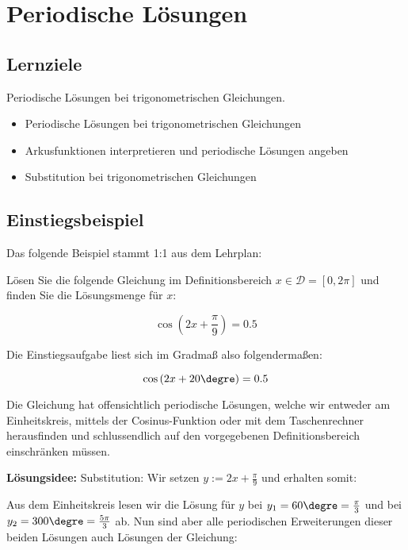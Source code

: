 
\section{Periodische Lösungen}

\subsection*{Lernziele}

Periodische Lösungen bei trigonometrischen Gleichungen.

\begin{itemize}
\item Periodische Lösungen bei trigonometrischen Gleichungen
\item Arkusfunktionen interpretieren und periodische Lösungen angeben
\item Substitution bei trigonometrischen Gleichungen
\end{itemize}



\subsection{Einstiegsbeispiel}
Das folgende Beispiel stammt 1:1 aus dem Lehrplan:

Lösen Sie die folgende Gleichung im Definitionsbereich $x \in \mathcal{D} = [ 0, 2\pi]$ und finden Sie die Lösungsmenge für $x$:

$$\cos\left(2x+\frac{\pi}{9}\right) = 0.5$$

Die Einstiegsaufgabe liest sich im Gradmaß also folgendermaßen:

$$\cos\left(2x+20\degre\right) = 0.5$$

Die Gleichung hat offensichtlich periodische Lösungen, welche wir entweder am Einheitskreis, mittels der Cosinus-Funktion oder mit dem Taschenrechner herausfinden und schlussendlich auf den vorgegebenen Definitionsbereich einschränken müssen.

\newpage


\textbf{Lösungsidee:} Substitution:
Wir setzen $y := 2x + \frac{\pi}{9}$ und erhalten somit:



Aus dem Einheitskreis lesen wir die Lösung für $y$ bei $y_1=60\degre = \frac{\pi}{3}$ und bei $y_2=300\degre = \frac{5\pi}{3}$ ab. Nun sind aber alle periodischen Erweiterungen dieser beiden Lösungen auch Lösungen der Gleichung:


